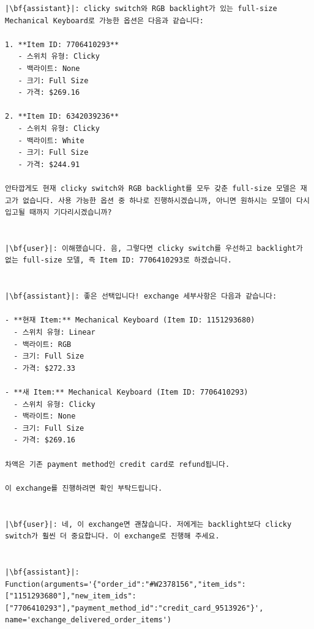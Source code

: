 \begin{longlisting}
\begin{verbatim}
|\bf{assistant}|: clicky switch와 RGB backlight가 있는 full-size Mechanical Keyboard로 가능한 옵션은 다음과 같습니다:

1. **Item ID: 7706410293**
   - 스위치 유형: Clicky
   - 백라이트: None
   - 크기: Full Size
   - 가격: $269.16

2. **Item ID: 6342039236**
   - 스위치 유형: Clicky
   - 백라이트: White
   - 크기: Full Size
   - 가격: $244.91

안타깝게도 현재 clicky switch와 RGB backlight를 모두 갖춘 full-size 모델은 재고가 없습니다. 사용 가능한 옵션 중 하나로 진행하시겠습니까, 아니면 원하시는 모델이 다시 입고될 때까지 기다리시겠습니까?


|\bf{user}|: 이해했습니다. 음, 그렇다면 clicky switch를 우선하고 backlight가 없는 full-size 모델, 즉 Item ID: 7706410293로 하겠습니다.


|\bf{assistant}|: 좋은 선택입니다! exchange 세부사항은 다음과 같습니다:

- **현재 Item:** Mechanical Keyboard (Item ID: 1151293680)
  - 스위치 유형: Linear
  - 백라이트: RGB
  - 크기: Full Size
  - 가격: $272.33

- **새 Item:** Mechanical Keyboard (Item ID: 7706410293)
  - 스위치 유형: Clicky
  - 백라이트: None
  - 크기: Full Size
  - 가격: $269.16

차액은 기존 payment method인 credit card로 refund됩니다.

이 exchange를 진행하려면 확인 부탁드립니다.


|\bf{user}|: 네, 이 exchange면 괜찮습니다. 저에게는 backlight보다 clicky switch가 훨씬 더 중요합니다. 이 exchange로 진행해 주세요.


|\bf{assistant}|: Function(arguments='{"order_id":"#W2378156","item_ids":["1151293680"],"new_item_ids":["7706410293"],"payment_method_id":"credit_card_9513926"}', name='exchange_delivered_order_items')



\end{verbatim}
\end{longlisting}
